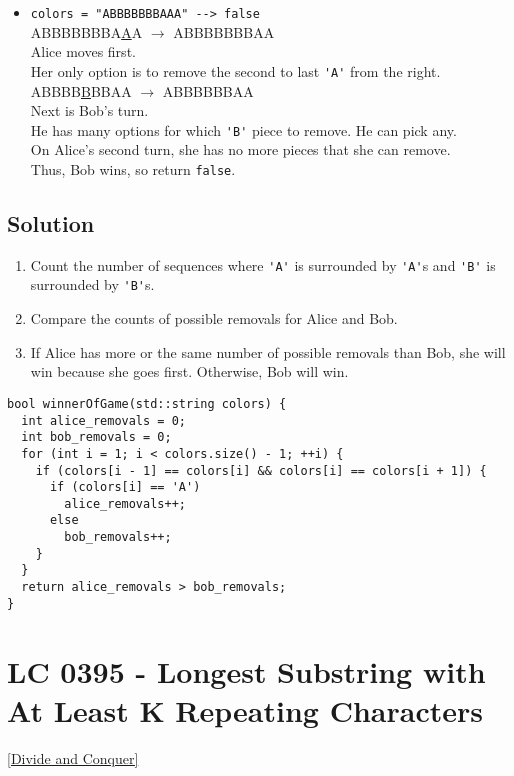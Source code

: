 {\begin{itemize}
Thus, Bob wins, so return {\colorbox{CodeBackground}{\lstinline|false|}}.
\item {\colorbox{CodeBackground}{\lstinline|colors = "ABBBBBBBAAA" --> false|}}\\
ABBBBBBBA\ul{A}A $\rightarrow$ ABBBBBBBAA\\
Alice moves first.\\
Her only option is to remove the second to last {\colorbox{CodeBackground}{\lstinline|'A'|}} from the right.\\

ABBBB\ul{B}BBAA $\rightarrow$ ABBBBBBAA\\
Next is Bob's turn.\\
He has many options for which {\colorbox{CodeBackground}{\lstinline|'B'|}} piece to remove. He can pick any.\\

On Alice's second turn, she has no more pieces that she can remove.\\
Thus, Bob wins, so return {\colorbox{CodeBackground}{\lstinline|false|}}.
\end{itemize}

\subsection*{Solution}
\begin{enumerate}
\item Count the number of sequences where {\colorbox{CodeBackground}{\lstinline|'A'|}} is surrounded by {\colorbox{CodeBackground}{\lstinline|'A'|}}s and {\colorbox{CodeBackground}{\lstinline|'B'|}} is surrounded by {\colorbox{CodeBackground}{\lstinline|'B'|}}s.
\item Compare the counts of possible removals for Alice and Bob.
\item If Alice has more or the same number of possible removals than Bob, she will win because she goes first. Otherwise, Bob will win.
\end{enumerate}
\begin{lstlisting}
bool winnerOfGame(std::string colors) {
  int alice_removals = 0;
  int bob_removals = 0;
  for (int i = 1; i < colors.size() - 1; ++i) {
    if (colors[i - 1] == colors[i] && colors[i] == colors[i + 1]) {
      if (colors[i] == 'A')
        alice_removals++;
      else
        bob_removals++;
    }
  }
  return alice_removals > bob_removals;
}
\end{lstlisting}

\section{LC 0395 - Longest Substring with At Least K Repeating Characters}\label{lc0395}
{\hyperref[sec:divide_and_conquer]{[Divide and Conquer]}}\\

}
